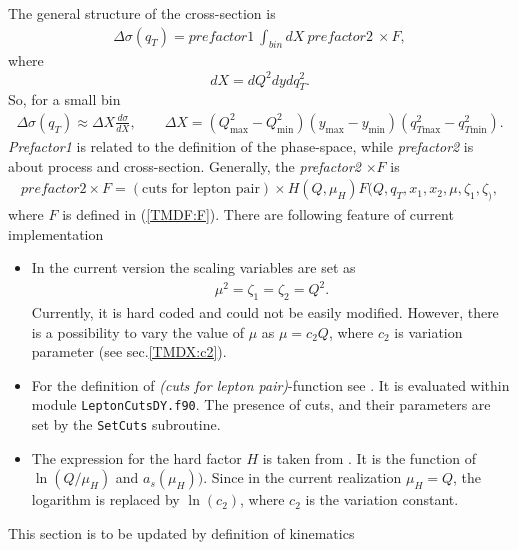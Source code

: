 \documentclass[prd,nofootinbib,eqsecnum,final]{revtex4}
\renewcommand{\(}{\left(}
\renewcommand{\)}{\right)}
\renewcommand{\[}{\left[}
\renewcommand{\]}{\right]}
\newcommand{\red}[1]{{\color[rgb]{1,0,0} #1}}
\begin{document}
The general structure of the cross-section is
\begin{eqnarray}
\Delta\sigma(q_T)=prefactor1~\int_{bin} dX ~prefactor2~\times F,
\end{eqnarray}
where $$dX=dQ^2 dy d q^2_T.$$ So, for a small bin
\begin{eqnarray}
\Delta\sigma(q_T)\approx\Delta X \frac{d\sigma}{dX},\qquad \Delta X=(Q_{\text{max}}^2-Q_{\text{min}}^2)(y_{\text{max}}-y_{\text{min}})(q_{T\text{max}}^2-q_{T\text{min}}^2).
\end{eqnarray}
\textit{Prefactor1} is related to the definition of the phase-space, while \textit{prefactor2} is about process and cross-section. Generally, the \textit{prefactor2} $\times F$ is
\begin{eqnarray}
prefactor2 \times F=(\text{cuts for lepton pair})\times H(Q,\mu_H)F(Q,q_T,x_1,x_2,\mu,\zeta_1,\zeta_),
\end{eqnarray}
where $F$ is defined in (\ref{TMDF:F}). There are following feature of current implementation
\begin{itemize}
\item In the current version the scaling variables are set as
\begin{eqnarray}
\mu^2=\zeta_1=\zeta_2=Q^2.
\end{eqnarray}
Currently, it is hard coded and could not be easily modified. However, there is a possibility to vary the value of $\mu$ as $\mu=c_2 Q$, where $c_2$ is variation parameter (see sec.\ref{TMDX:c2}).
\item For the definition of \textit{(cuts for lepton pair)}-function see \cite{Scimemi:2017etj}. It is evaluated within module \texttt{LeptonCutsDY.f90}. The presence of cuts, and their parameters are set by the \texttt{SetCuts} subroutine.
\item The expression for the hard factor $H$ is taken from \cite{Gehrmann:2010ue}. It is the function of $\ln(Q/\mu_H)$ and $a_s(\mu_H))$. Since in the current realization $\mu_H=Q$, the logarithm is replaced by $\ln(c_2)$, where $c_2$ is the variation constant.
\end{itemize}

\red{This section is to be updated by definition of kinematics }
\end{document}

